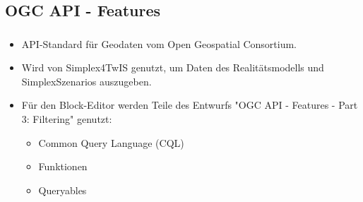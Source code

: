 \subsection{OGC API - Features}
\begin{frame}
  \frametitle{\currentsectionname}

  \begin{itemize}
    \item API-Standard für Geodaten vom Open Geospatial Consortium.
    \item Wird von Simplex4TwIS genutzt, um Daten des Realitätsmodells und SimplexSzenarios auszugeben.
    \item Für den Block-Editor werden Teile des Entwurfs "OGC API - Features - Part 3: Filtering" genutzt:
          \begin{itemize}
            \item Common Query Language (CQL)
            \item Funktionen
            \item Queryables
          \end{itemize}
  \end{itemize}


\end{frame}

